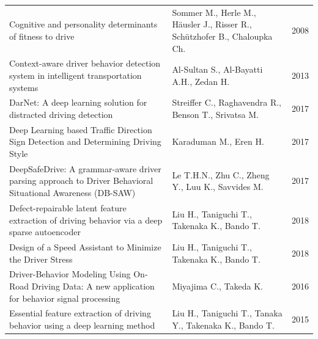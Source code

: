 \documentclass[10pt,journal,compsoc]{IEEEtran}
\begin{document}
\begin{table}[!t]
\begin{tabular}{p{10cm}p{7cm}l}
Cognitive and personality determinants of fitness to drive                                                                                       & Sommer M., Herle M., Häusler J., Risser R., Schützhofer B., Chaloupka Ch.    & 2008                             \\
Context-aware driver behavior detection system in intelligent transportation systems                                                             & Al-Sultan S., Al-Bayatti A.H., Zedan H.                                      & 2013                             \\
DarNet: A deep learning solution for distracted driving detection                                                                                & Streiffer C., Raghavendra R., Benson T., Srivatsa M.                         & 2017                             \\
Deep Learning based Traffic Direction Sign Detection and Determining Driving Style                                                               & Karaduman M., Eren H.                                                        & 2017                             \\
DeepSafeDrive: A grammar-aware driver parsing approach to Driver Behavioral Situational Awareness (DB-SAW)                                       & Le T.H.N., Zhu C., Zheng Y., Luu K., Savvides M.                             & 2017                             \\
Defect-repairable latent feature extraction of driving behavior via a deep sparse autoencoder                                                    & Liu H., Taniguchi T., Takenaka K., Bando T.                                  & 2018                             \\
Design of a Speed Assistant to Minimize the Driver Stress                                                                                        & Liu H., Taniguchi T., Takenaka K., Bando T.                                  & 2018                             \\
Driver-Behavior Modeling Using On-Road Driving Data: A new application for behavior signal processing                                            & Miyajima C., Takeda K.                                                       & 2016                             \\
Essential feature extraction of driving behavior using a deep learning method                                                                    & Liu H., Taniguchi T., Tanaka Y., Takenaka K., Bando T.                       & 2015                             \\

\end{tabular}
\end{table}
\end{document}

